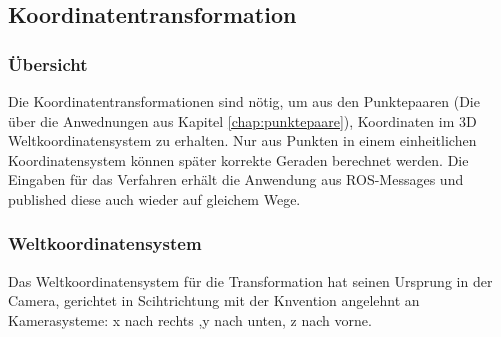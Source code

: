 \subsection{Koordinatentransformation}
\subsubsection{Übersicht}
Die Koordinatentransformationen sind nötig, um aus den Punktepaaren (Die über die Anwednungen aus Kapitel \ref{chap:punktepaare}), Koordinaten im 3D Weltkoordinatensystem zu erhalten. Nur aus Punkten in einem einheitlichen Koordinatensystem können später korrekte Geraden berechnet werden.
Die Eingaben für das Verfahren erhält die Anwendung aus ROS-Messages und published diese auch wieder auf gleichem Wege.
\subsubsection{Weltkoordinatensystem}
Das Weltkoordinatensystem für die Transformation hat seinen Ursprung in der Camera, gerichtet in Scihtrichtung mit der Knvention angelehnt an Kamerasysteme: x nach rechts  ,y nach unten, z nach vorne.
